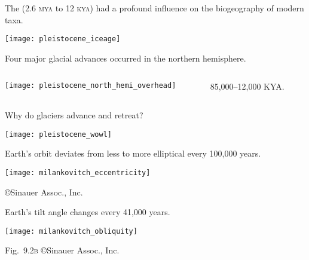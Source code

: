 \documentclass[t]{beamer}
\begin{document}

\begin{frame}{The  (2.6 \textsc{mya} to 12 \textsc{kya}) had a profound influence on the biogeography of modern taxa.}
	\begin{center}
			\texttt{[image: pleistocene\_iceage]}
			
	\end{center}
\end{frame}

\begin{frame}{Four major glacial advances occurred in the northern hemisphere.}
	\begin{columns}[T]
		\begin{column}{0.45\textwidth}
			\texttt{[image: pleistocene\_north\_hemi\_overhead]}
		\end{column}
		\begin{column}{0.45\textwidth}
			\hangpara{}
			
			\hangpara{}
			
			\hangpara{}
			
			\hangpara{} 85,000–12,000 KYA.
			
		\end{column}
	\end{columns}
\end{frame}


\begin{frame}{Why do glaciers advance and retreat?}
	\begin{center}
		\texttt{[image: pleistocene\_wowl]}
	\end{center}
\end{frame}

\begin{frame}{ Earth’s orbit deviates from less to more elliptical every 100,000 years.}
	\begin{center}
		\texttt{[image: milankovitch\_eccentricity]}
	\end{center}

	\vfilll
	
	\hfill \tiny \copyright Sinauer Assoc., Inc.
\end{frame}

\begin{frame}{ Earth’s tilt angle changes every 41,000 years.}

	{\centering
		\texttt{[image: milankovitch\_obliquity]}\par
	}

	\vfilll

	\hfill \tiny Fig.~9.2\textsc{b} \copyright Sinauer Assoc., Inc.

\end{frame}
\end{document}
